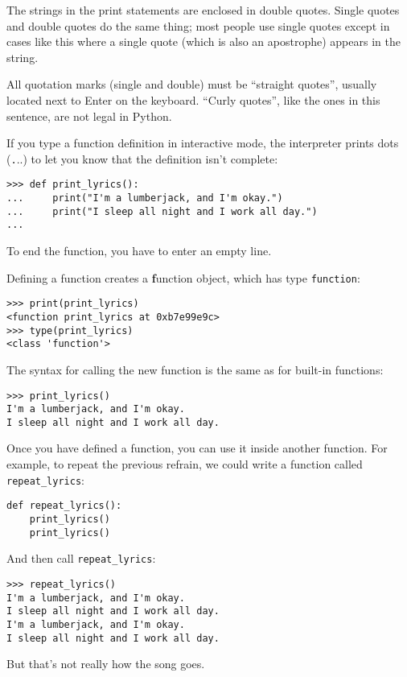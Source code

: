 \documentclass[
DIV=11,
fontsize=12,
twoside,
headinclude=false,
titlepage=firstiscover,
abstract=true,
headsepline=true,
footsepline=true,
chapterprefix=true, %
headings=big,
bibliography=totoc,%
captions=tableheading
]{scrbook}
\theoremstyle{definition}
\begin{document}
The strings in the print statements are enclosed in double
quotes.  Single quotes and double quotes do the same thing;
most people use single quotes except in cases like this where
a single quote (which is also an apostrophe) appears in the string.

All quotation marks (single and double)
must be ``straight quotes'', usually
located next to Enter on the keyboard.  ``Curly quotes'', like
the ones in this sentence, are not legal in Python.

If you type a function definition in interactive mode, the interpreter
prints dots ({\texttt ...}) to let you know that the definition
isn't complete:

\begin{lstlisting}
>>> def print_lyrics():
...     print("I'm a lumberjack, and I'm okay.")
...     print("I sleep all night and I work all day.")
...
\end{lstlisting}
%
To end the function, you have to enter an empty line.

Defining a function creates a {\textbf function object}, which
has type \verb"function":

\begin{lstlisting}
>>> print(print_lyrics)
<function print_lyrics at 0xb7e99e9c>
>>> type(print_lyrics)
<class 'function'>
\end{lstlisting}
%
The syntax for calling the new function is the same as
for built-in functions:

\begin{lstlisting}
>>> print_lyrics()
I'm a lumberjack, and I'm okay.
I sleep all night and I work all day.
\end{lstlisting}
%
Once you have defined a function, you can use it inside another
function.  For example, to repeat the previous refrain, we could write
a function called \verb"repeat_lyrics":

\begin{lstlisting}
def repeat_lyrics():
    print_lyrics()
    print_lyrics()
\end{lstlisting}
%
And then call \verb"repeat_lyrics":

\begin{lstlisting}
>>> repeat_lyrics()
I'm a lumberjack, and I'm okay.
I sleep all night and I work all day.
I'm a lumberjack, and I'm okay.
I sleep all night and I work all day.
\end{lstlisting}
%
But that's not really how the song goes.
\end{document}
